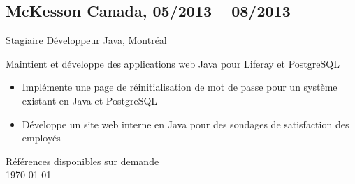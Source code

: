 \documentclass{article}
\begin{document}
\begin{paracol}{2}
\begin{rightcolumn}
    \subsection{McKesson Canada, 05/2013 -- 08/2013}  
    {Stagiaire Développeur Java, Montréal\par}  
    {  
      Maintient et développe des applications web Java pour Liferay et PostgreSQL  
    \par}  
    \begin{itemize}  
      \item Implémente une page de réinitialisation de mot de passe pour un système existant en Java et PostgreSQL  
      \item Développe un site web interne en Java pour des sondages de satisfaction des employés  
    \end{itemize}  

    \vspace{2em}  

    Références disponibles sur demande \\  
    \today

    \flushpage

    \par\vfill

  \end{rightcolumn}
\end{paracol}
\end{document}
